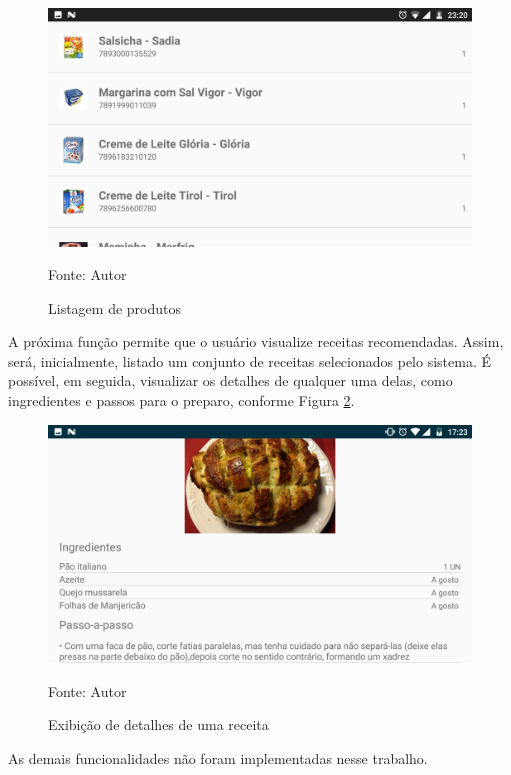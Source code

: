 \begin{figure}[htb]
    \caption{Listagem de produtos}
    \label{fig:cap4_listagem_de_produtos}
    \includegraphics[width=\textwidth]{figuras/cap4_listagem_de_produtos.png}
    
   \footnotesize{Fonte: Autor}
\end{figure}

A próxima função permite que o usuário visualize receitas recomendadas. Assim, será, inicialmente, listado um conjunto de receitas selecionados pelo sistema. É possível, em seguida, visualizar os detalhes de qualquer uma delas, como ingredientes e passos para o preparo, conforme Figura \ref{fig:cap4_exibicao_receita}.

\begin{figure}[htb]
    \caption{Exibição de detalhes de uma receita}
    \label{fig:cap4_exibicao_receita}
    \includegraphics[width=\textwidth]{figuras/cap4_exibicao_receita.png}
    
   \footnotesize{Fonte: Autor}
\end{figure}

As demais funcionalidades não foram implementadas nesse trabalho.


